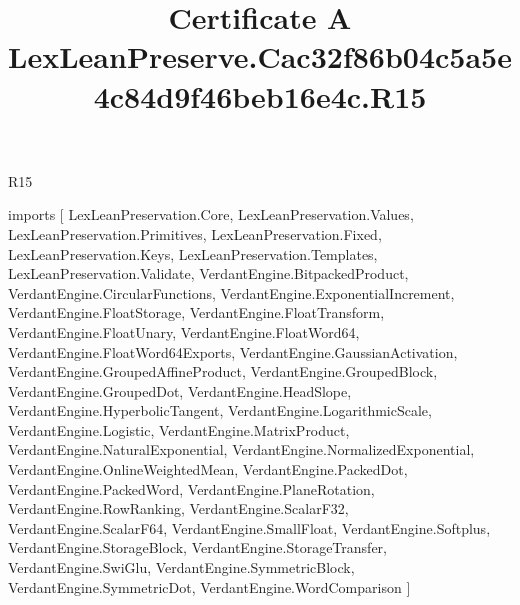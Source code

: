 \begin{lexlean}{R15}
\title{Certificate A LexLeanPreserve.Cac32f86b04c5a5e4c84d9f46beb16e4c.R15}
\begin{coremodule}
imports [
  LexLeanPreservation.Core,
  LexLeanPreservation.Values,
  LexLeanPreservation.Primitives,
  LexLeanPreservation.Fixed,
  LexLeanPreservation.Keys,
  LexLeanPreservation.Templates,
  LexLeanPreservation.Validate,
  VerdantEngine.BitpackedProduct,
  VerdantEngine.CircularFunctions,
  VerdantEngine.ExponentialIncrement,
  VerdantEngine.FloatStorage,
  VerdantEngine.FloatTransform,
  VerdantEngine.FloatUnary,
  VerdantEngine.FloatWord64,
  VerdantEngine.FloatWord64Exports,
  VerdantEngine.GaussianActivation,
  VerdantEngine.GroupedAffineProduct,
  VerdantEngine.GroupedBlock,
  VerdantEngine.GroupedDot,
  VerdantEngine.HeadSlope,
  VerdantEngine.HyperbolicTangent,
  VerdantEngine.LogarithmicScale,
  VerdantEngine.Logistic,
  VerdantEngine.MatrixProduct,
  VerdantEngine.NaturalExponential,
  VerdantEngine.NormalizedExponential,
  VerdantEngine.OnlineWeightedMean,
  VerdantEngine.PackedDot,
  VerdantEngine.PackedWord,
  VerdantEngine.PlaneRotation,
  VerdantEngine.RowRanking,
  VerdantEngine.ScalarF32,
  VerdantEngine.ScalarF64,
  VerdantEngine.SmallFloat,
  VerdantEngine.Softplus,
  VerdantEngine.StorageBlock,
  VerdantEngine.StorageTransfer,
  VerdantEngine.SwiGlu,
  VerdantEngine.SymmetricBlock,
  VerdantEngine.SymmetricDot,
  VerdantEngine.WordComparison
]


\end{coremodule}
\end{lexlean}
